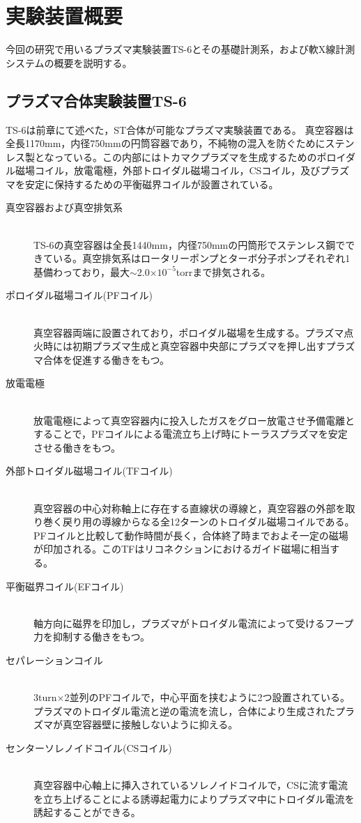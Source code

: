 \chapter{実験装置概要}
今回の研究で用いるプラズマ実験装置TS-6とその基礎計測系，および軟X線計測システムの概要を説明する。

\section{プラズマ合体実験装置TS-6}

TS-6は前章にて述べた，ST合体が可能なプラズマ実験装置である。
真空容器は全長1170mm，内径750mmの円筒容器であり，不純物の混入を防ぐためにステンレス製となっている。この内部にはトカマクプラズマを生成するためのポロイダル磁場コイル，放電電極，外部トロイダル磁場コイル，CSコイル，及びプラズマを安定に保持するための平衡磁界コイルが設置されている。

\begin{description}
	\item[真空容器および真空排気系]\mbox{}\\TS-6の真空容器は全長1440mm，内径750mmの円筒形でステンレス鋼でできている。真空排気系はロータリーポンプとターボ分子ポンプそれぞれ1基備わっており，最大$\sim$2.0$\times10^{-5}$torrまで排気される。
	\item[ポロイダル磁場コイル(PFコイル)]\mbox{}\\真空容器両端に設置されており，ポロイダル磁場を生成する。プラズマ点火時には初期プラズマ生成と真空容器中央部にプラズマを押し出すプラズマ合体を促進する働きをもつ。
	\item[放電電極]\mbox{}\\放電電極によって真空容器内に投入したガスをグロー放電させ予備電離とすることで，PFコイルによる電流立ち上げ時にトーラスプラズマを安定させる働きをもつ。
	\item[外部トロイダル磁場コイル(TFコイル)]\mbox{}\\真空容器の中心対称軸上に存在する直線状の導線と，真空容器の外部を取り巻く戻り用の導線からなる全12ターンのトロイダル磁場コイルである。PFコイルと比較して動作時間が長く，合体終了時までおよそ一定の磁場が印加される。このTFはリコネクションにおけるガイド磁場に相当する。
	\item[平衡磁界コイル(EFコイル)]\mbox{}\\軸方向に磁界を印加し，プラズマがトロイダル電流によって受けるフープ力を抑制する働きをもつ。
	\item[セパレーションコイル]\mbox{}\\3turn$\times$2並列のPFコイルで，中心平面を挟むように2つ設置されている。プラズマのトロイダル電流と逆の電流を流し，合体により生成されたプラズマが真空容器壁に接触しないように抑える。
	\item[センターソレノイドコイル(CSコイル)]\mbox{}\\真空容器中心軸上に挿入されているソレノイドコイルで，CSに流す電流を立ち上げることによる誘導起電力によりプラズマ中にトロイダル電流を誘起することができる。
\end{description}

